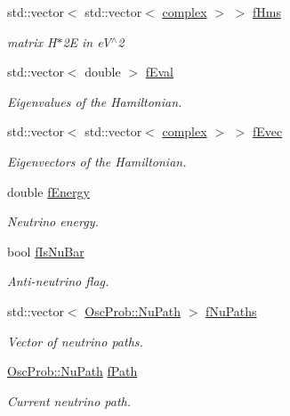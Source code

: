 \begin{DoxyCompactItemize}
std\+::vector$<$ std\+::vector$<$ \hyperlink{classOscProb_1_1PMNS__Base_ae86ec4718808ce9d02e5f5b4226714ab}{complex} $>$ $>$ \hyperlink{classOscProb_1_1PMNS__Base_adf5901166216e8c7a5cff2092952f473}{f\+Hms}
\begin{DoxyCompactList}\small\item\em matrix H$\ast$2E in e\+V$^\wedge$2 \end{DoxyCompactList}\item 
std\+::vector$<$ double $>$ \hyperlink{classOscProb_1_1PMNS__Base_a6319c34d7decbb9d7d6da279c06e8c2d}{f\+Eval}
\begin{DoxyCompactList}\small\item\em Eigenvalues of the Hamiltonian. \end{DoxyCompactList}\item 
std\+::vector$<$ std\+::vector$<$ \hyperlink{classOscProb_1_1PMNS__Base_ae86ec4718808ce9d02e5f5b4226714ab}{complex} $>$ $>$ \hyperlink{classOscProb_1_1PMNS__Base_a093e7bd31d4ef52ed52df414e12c1d17}{f\+Evec}
\begin{DoxyCompactList}\small\item\em Eigenvectors of the Hamiltonian. \end{DoxyCompactList}\item 
double \hyperlink{classOscProb_1_1PMNS__Base_a2800af6d436972f3e900867790c046b0}{f\+Energy}
\begin{DoxyCompactList}\small\item\em Neutrino energy. \end{DoxyCompactList}\item 
bool \hyperlink{classOscProb_1_1PMNS__Base_a0ebaeaefab36a3ff381c6293faedfdd6}{f\+Is\+Nu\+Bar}
\begin{DoxyCompactList}\small\item\em Anti-\/neutrino flag. \end{DoxyCompactList}\item 
std\+::vector$<$ \hyperlink{structOscProb_1_1NuPath}{Osc\+Prob\+::\+Nu\+Path} $>$ \hyperlink{classOscProb_1_1PMNS__Base_a69db9d57e12fc7cbe0431bc6c18fac93}{f\+Nu\+Paths}
\begin{DoxyCompactList}\small\item\em Vector of neutrino paths. \end{DoxyCompactList}\item 
\hyperlink{structOscProb_1_1NuPath}{Osc\+Prob\+::\+Nu\+Path} \hyperlink{classOscProb_1_1PMNS__Base_a849437aa8891fe042e86886ce8f81c6e}{f\+Path}
\begin{DoxyCompactList}\small\item\em Current neutrino path. \end{DoxyCompactList}\item 

\end{DoxyCompactItemize}
